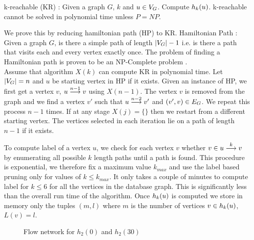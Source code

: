 \begin{thm}
k-reachable (KR) : Given a graph $G$, $k$ and $u \in \vg$. Compute $\khopl{k}{u}$.
k-reachable cannot be solved in polynomial time unless $P = NP$.

\begin{myproof}
We prove this by reducing hamiltonian path (HP) to KR.
Hamiltonian Path : Given a graph $G$, is there a simple path of length
$|\vg|-1$ i.e. is there a path that visits each and every vertex exactly
once. The problem of finding a Hamiltonian path is proven to be an NP-Complete
problem \cite{npcomplete}.\\
Assume that algorithm $X(k)$ can compute KR in polynomial time. Let $|\vg| = n$ 
and $u$ be starting vertex in HP if it exists.
Given an instance of HP, we first get a vertex $v$, $\kpath{u}{v}{n-1}$ using
$X(n-1)$. The vertex $v$ is removed from the graph and we find a vertex $v'$
such that $\kpath{u}{v'}{n-2}$ and $(v', v) \in \eg$. We repeat this process
$n-1$ times. If at any stage $X(j) = \{\}$ then we restart from a different starting
vertex. The vertices selected in each iteration lie on a path of length $n-1$ if it exists.
\end{myproof}
\end{thm}

To compute \khop label of a vertex $u$, we check for each vertex $v$ whether
$v \in \kpath{u}{v}{k}$ by enumerating all possible $k$ length
paths until a path is found.
This procedure is exponential, we therefore fix a maximum value $k_{max}$ and use
the \khop label based pruning only for values of $k \leq k_{max}$.
It only takes a couple of minutes to compute \khop label for 
$k \leq 6$ for all the vertices in the database graph. This is 
significantly less than the overall run time of the algorithm. Once 
$\khopl{k}{u}$ is computed we store in memory only the tuples $(m, l)$
where $m$ is the number of vertices $v \in \khopl{k}{u}$, $L(v) = l$.



\begin{figure}[!h]
    \centering
{}
    \caption{Flow network for $h_2(0)$ and $h_2(30)$}
	\label{fig:Hflow}
\end{figure}
